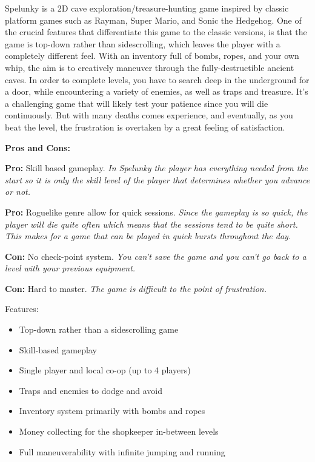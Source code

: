 \documentclass[12p]{article}
\begin{document}
Spelunky is a 2D cave exploration/treasure-hunting game inspired by classic platform games such as Rayman, Super Mario, and Sonic the Hedgehog. One of the crucial features that differentiate this game to the classic versions, is that the game is top-down rather than sidescrolling, which leaves the player with a completely different feel. With an inventory full of bombs, ropes, and your own whip, the aim is to creatively maneuver through the fully-destructible ancient caves. In order to complete levels, you have to search deep in the underground for a door, while encountering a variety of enemies, as well as traps and treasure. It's a challenging game that will likely test your patience since you will die continuously. But with many deaths comes experience, and eventually, as you beat the level, the frustration is overtaken by a great feeling of satisfaction.

\textbf{Pros and Cons:}

\textbf{Pro:} Skill based gameplay. \emph{In Spelunky the player has everything needed from the start so it is only the skill level of the player that determines whether you advance or not.}

\textbf{Pro:} Roguelike genre allow for quick sessions. \emph{Since the gameplay is so quick, the player will die quite often which means that the sessions tend to be quite short. This makes for a game that can be played in quick bursts throughout the day.}

\textbf{Con:} No check-point system. \emph{You can't save the game and you can't go back to a level with your previous equipment.}

\textbf{Con:} Hard to master. \emph{The game is difficult to the point of frustration.}

\newpage

Features:

\begin{itemize}
  \item Top-down rather than a sidescrolling game
  \item Skill-based gameplay
  \item Single player and local co-op (up to 4 players)
  \item Traps and enemies to dodge and avoid
  \item Inventory system primarily with bombs and ropes
  \item Money collecting for the shopkeeper in-between levels
  \item Full maneuverability with infinite jumping and running
\end{itemize}
\end{document}

